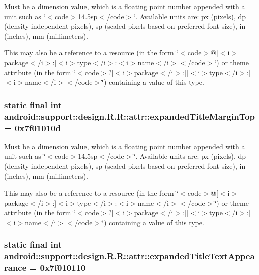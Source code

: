 Must be a dimension value, which is a floating point number appended with a unit such as \char`\"{}$<$code$>$14.5sp$<$/code$>$\char`\"{}. Available units are: px (pixels), dp (density-independent pixels), sp (scaled pixels based on preferred font size), in (inches), mm (millimeters). 

This may also be a reference to a resource (in the form \char`\"{}$<$code$>$@\mbox{[}$<$i$>$package$<$/i$>$:\mbox{]}$<$i$>$type$<$/i$>$:$<$i$>$name$<$/i$>$$<$/code$>$\char`\"{}) or theme attribute (in the form \char`\"{}$<$code$>$?\mbox{[}$<$i$>$package$<$/i$>$:\mbox{]}\mbox{[}$<$i$>$type$<$/i$>$:\mbox{]}$<$i$>$name$<$/i$>$$<$/code$>$\char`\"{}) containing a value of this type. \hypertarget{classandroid_1_1support_1_1design_1_1_r_1_1attr_6b7340bc2b0ca86046e851fc45aaf7e2}{
\subsubsection[{expandedTitleMarginTop}]{\setlength{\rightskip}{0pt plus 5cm}static final int android::support::design.R.R::attr::expandedTitleMarginTop = 0x7f01010d}}
\label{classandroid_1_1support_1_1design_1_1_r_1_1attr_6b7340bc2b0ca86046e851fc45aaf7e2}


Must be a dimension value, which is a floating point number appended with a unit such as \char`\"{}$<$code$>$14.5sp$<$/code$>$\char`\"{}. Available units are: px (pixels), dp (density-independent pixels), sp (scaled pixels based on preferred font size), in (inches), mm (millimeters). 

This may also be a reference to a resource (in the form \char`\"{}$<$code$>$@\mbox{[}$<$i$>$package$<$/i$>$:\mbox{]}$<$i$>$type$<$/i$>$:$<$i$>$name$<$/i$>$$<$/code$>$\char`\"{}) or theme attribute (in the form \char`\"{}$<$code$>$?\mbox{[}$<$i$>$package$<$/i$>$:\mbox{]}\mbox{[}$<$i$>$type$<$/i$>$:\mbox{]}$<$i$>$name$<$/i$>$$<$/code$>$\char`\"{}) containing a value of this type. \hypertarget{classandroid_1_1support_1_1design_1_1_r_1_1attr_d98eff7ce386c4dc8f8239a456987f5d}{
\subsubsection[{expandedTitleTextAppearance}]{\setlength{\rightskip}{0pt plus 5cm}static final int android::support::design.R.R::attr::expandedTitleTextAppearance = 0x7f010110}}
\label{classandroid_1_1support_1_1design_1_1_r_1_1attr_d98eff7ce386c4dc8f8239a456987f5d}


